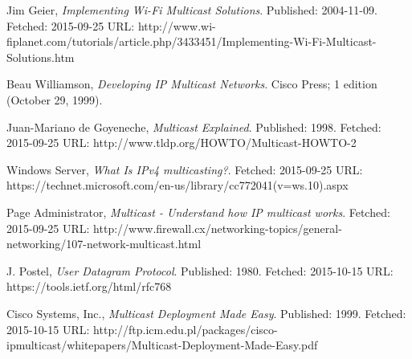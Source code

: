 \documentclass[9pt,a4paper]{acmproc}
\begin{document}
\begin{thebibliography}{9}

  Jim Geier,
  \emph{Implementing Wi-Fi Multicast Solutions}.
  \newline
  Published: 2004-11-09. Fetched: 2015-09-25 \newline
  URL: http://www.wi-fiplanet.com/tutorials/article.php/3433451/Implementing-Wi-Fi-Multicast-Solutions.htm
  
	Beau Williamson,
	\emph{Developing IP Multicast Networks}.
	\newline
Cisco Press; 1 edition (October 29, 1999).

  Juan-Mariano de Goyeneche,
  \emph{Multicast Explained}.
  \newline
  Published: 1998. Fetched: 2015-09-25 \newline
  URL: http://www.tldp.org/HOWTO/Multicast-HOWTO-2
  
  Windows Server,
  \emph{What Is IPv4 multicasting?}.
  \newline
  Fetched: 2015-09-25 \newline
  URL: https://technet.microsoft.com/en-us/library/cc772041(v=ws.10).aspx
  
  Page Administrator,
  \emph{Multicast - Understand how IP multicast works}.
  \newline
  Fetched: 2015-09-25 \newline
  URL: http://www.firewall.cx/networking-topics/general-networking/107-network-multicast.html
  
  J. Postel,
  \emph{User Datagram Protocol}.
  \newline
  Published: 1980. Fetched: 2015-10-15 \newline
  URL: https://tools.ietf.org/html/rfc768
  
  Cisco Systems, Inc.,
  \emph{Multicast Deployment Made Easy}.
  \newline
  Published: 1999. Fetched: 2015-10-15 \newline
  URL: http://ftp.icm.edu.pl/packages/cisco-ipmulticast/whitepapers/Multicast-Deployment-Made-Easy.pdf
  



\end{thebibliography}
\end{document}
